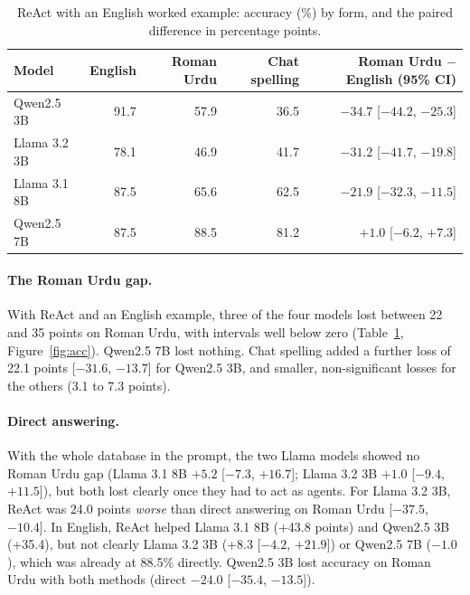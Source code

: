 \documentclass[11pt]{article}
\begin{document}
\begin{table}[t]
\centering
\small
\begin{tabular}{lrrrr}
\toprule
Model & English & Roman Urdu & Chat spelling & Roman Urdu $-$ English (95\% CI) \\
\midrule
Qwen2.5 3B & 91.7 & 57.9 & 36.5 & $-34.7$ [$-44.2$, $-25.3$] \\
Llama 3.2 3B & 78.1 & 46.9 & 41.7 & $-31.2$ [$-41.7$, $-19.8$] \\
Llama 3.1 8B & 87.5 & 65.6 & 62.5 & $-21.9$ [$-32.3$, $-11.5$] \\
Qwen2.5 7B & 87.5 & 88.5 & 81.2 & $+1.0$ [$-6.2$, $+7.3$] \\
\bottomrule
\end{tabular}
\caption{ReAct with an English worked example: accuracy (\%) by form, and the paired difference in percentage points.}
\label{tab:main}
\end{table}

\paragraph{The Roman Urdu gap.} With ReAct and an English example, three of the four models lost between 22 and 35 points on Roman Urdu, with intervals well below zero (Table~\ref{tab:main}, Figure~\ref{fig:acc}). Qwen2.5 7B lost nothing. Chat spelling added a further loss of 22.1 points [$-31.6$, $-13.7$] for Qwen2.5 3B, and smaller, non-significant losses for the others (3.1 to 7.3 points).

\paragraph{Direct answering.} With the whole database in the prompt, the two Llama models showed no Roman Urdu gap (Llama 3.1 8B $+5.2$ [$-7.3$, $+16.7$]; Llama 3.2 3B $+1.0$ [$-9.4$, $+11.5$]), but both lost clearly once they had to act as agents. For Llama 3.2 3B, ReAct was 24.0 points \emph{worse} than direct answering on Roman Urdu [$-37.5$, $-10.4$]. In English, ReAct helped Llama 3.1 8B (+43.8 points) and Qwen2.5 3B (+35.4), but not clearly Llama 3.2 3B (+8.3 [$-4.2$, $+21.9$]) or Qwen2.5 7B ($-1.0$), which was already at 88.5\% directly. Qwen2.5 3B lost accuracy on Roman Urdu with both methods (direct $-24.0$ [$-35.4$, $-13.5$]).
\end{document}
